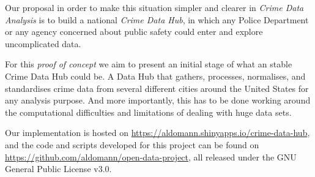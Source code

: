 Our proposal in order to make this situation simpler and clearer in \emph{Crime Data Analysis} is to build a national \emph{Crime Data Hub}, in which any Police Department or any agency concerned about public safety could enter and explore uncomplicated data.

For this \emph{proof of concept} we aim to present an initial stage of what an stable Crime Data Hub could be. A Data Hub that gathers, processes, normalises, and standardises crime data from several different cities around the United States for any analysis purpose. And more importantly, this has to be done working around the computational difficulties and limitations of dealing with huge data sets.

\bigskip
Our implementation is hosted on \url{https://aldomann.shinyapps.io/crime-data-hub}, and the code and scripts developed for this project can be found on \url{https://github.com/aldomann/open-data-project}, all released under the GNU General Public License v3.0.
